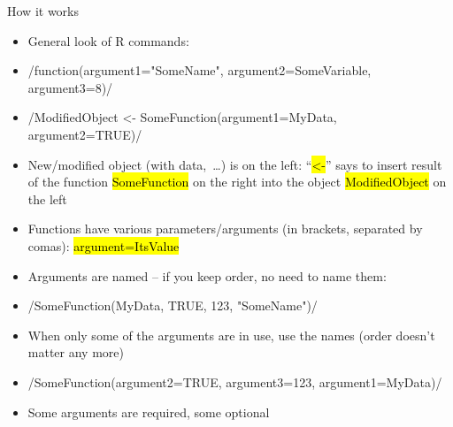 \documentclass[compress, ucs, xelatex, 11pt, xcolor=svgnames,
  hyperref={
    bookmarks=true,
    unicode=true,
    colorlinks=true,
    pdftitle={Molecular data in R},
    plainpages=false,
    pdfauthor={Vojtech Zeisek},
    pdfsubject={Course about phylogeny and evolution in R},
    pdfcreator={XeLaTeX},
    pdfkeywords={R, evolution, phylogeny, molecular data},
    linkcolor=Tomato,
    anchorcolor=SaddleBrown,
    citecolor=Goldenrod,
    filecolor=DarkMagenta,
    menucolor=Sienna,
    urlcolor=DarkTurquoise,
    pdftex},
  url={hyphens, lowtilde} %
  ]{beamer}
\renewcommand{\texttt}[1]{\hl{\ttfamily #1}}
\begin{document}
\begin{frame}{How it works}
  \begin{itemize}
    \item General look of R commands:
    \item \splus/function(argument1="SomeName", argument2=SomeVariable, argument3=8)/
    \item \splus/ModifiedObject <- SomeFunction(argument1=MyData, argument2=TRUE)/
    \item New/modified object (with data,~\ldots) is on the left: ``\texttt{<-}'' says to insert result of the function \texttt{SomeFunction} on the right into the object \texttt{ModifiedObject} on the left
    \item Functions have various parameters/arguments (in brackets, separated by comas): \texttt{argument=ItsValue}
    \item Arguments are named -- if you keep order, no need to name them:
    \item \splus/SomeFunction(MyData, TRUE, 123, "SomeName")/
    \item When only some of the arguments are in use, use the names (order doesn't matter any more)
    \item \splus/SomeFunction(argument2=TRUE, argument3=123, argument1=MyData)/
    \item Some arguments are required, some optional
  \end{itemize}
\end{frame}
\end{document}
